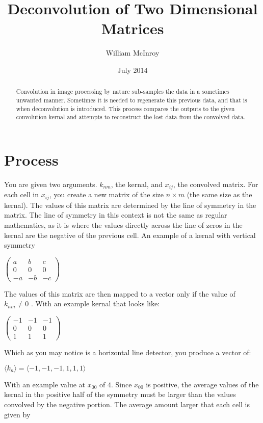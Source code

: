 \documentclass{article}
\begin{document}
\title{Deconvolution of Two Dimensional Matrices}
\author{William McInroy}
\date{July 2014}
\maketitle

\begin{abstract}
Convolution in image processing by nature sub-samples the data in a sometimes unwanted manner. Sometimes it is needed to regenerate this previous data, and that is when deconvolution is introduced. This process compares the outputs to the given convolution kernal and attempts to reconstruct the lost data from the convolved data.
\end{abstract}

\section{Process}

You are given two arguments. $k_{nm}$, the kernal, and $x_{ij}$, the convolved matrix. For each cell in $x_{ij}$, you create a new matrix of the size $n\times m$ (the same size as the kernal). The values of this matrix are determined by the line of symmetry in the matrix. The line of symmetry in this context is not the same as regular mathematics, as it is where the values directly across the line of zeros in the kernal are the negative of the previous cell. An example of a kernal with vertical symmetry

$ \left( \begin{array}{ccc}
a & b & c \\
0 & 0 & 0 \\
-a & -b & -c \end{array} \right)$

The values of this matrix are then mapped to a vector only if the value of $k_{nm} \neq 0$ . With an example kernal that looks like:

$\left( \begin{array}{ccc}
-1 & -1 & -1 \\
0 & 0 & 0 \\
1 & 1 & 1 \end{array} \right)$

Which as you may notice is a horizontal line detector, you produce a vector of:

$\langle k_n \rangle = \langle -1, -1, -1, 1, 1, 1 \rangle$

 With an example value at $x_{00}$ of $4$. Since $x_{00}$ is positive, the average values of the kernal in the positive half of the symmetry must be larger than the values convolved by the negative portion. The average amount larger that each cell is given by
\end{document}

